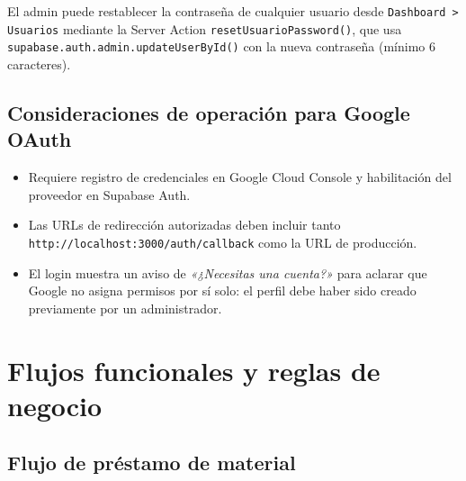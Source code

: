 \documentclass[12pt,a4paper,oneside]{report}
\newcommand{\file}[1]{\texttt{\color{cecyteDark}#1}}
\begin{document}
El admin puede restablecer la contraseña de cualquier usuario desde \file{Dashboard > Usuarios} mediante la Server Action \file{resetUsuarioPassword()}, que usa \file{supabase.auth.admin.updateUserById()} con la nueva contraseña (mínimo 6 caracteres).

\section{Consideraciones de operación para Google OAuth}

\begin{itemize}
  \item Requiere registro de credenciales en Google Cloud Console y habilitación del proveedor en Supabase Auth.
  \item Las URLs de redirección autorizadas deben incluir tanto \file{http://localhost:3000/auth/callback} como la URL de producción.
  \item El login muestra un aviso de \textit{«¿Necesitas una cuenta?»} para aclarar que Google no asigna permisos por sí solo: el perfil debe haber sido creado previamente por un administrador.
\end{itemize}

\chapter{Flujos funcionales y reglas de negocio}

\section{Flujo de préstamo de material}
\end{document}
